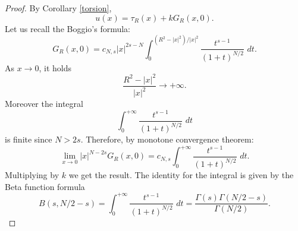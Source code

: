 \documentclass[11pt,a4paper]{article}
\newcommand{\dd}{\,d}
\begin{document}
\begin{proof}
By Corollary \ref{torsion},
\[
u(x)=\tau_{R}(x)+k G_{R}(x,0).
\]
Let us recall the Boggio's formula:
\[
G_{R}(x,0)
=
c_{N,s}|x|^{2s-N}
\int_0^{(R^2-|x|^2)/|x|^2}
\frac{t^{s-1}}{(1+t)^{N/2}}\,\dd t.
\]
As \(x\to0\), it holds
\[
\frac{R^2-|x|^2}{|x|^2}\to+\infty.
\]
Moreover the integral
\[
\int_0^{+\infty}\frac{t^{s-1}}{(1+t)^{N/2}}\,\dd t
\]
is finite since \(N>2s\). Therefore, by monotone convergence theorem:
\[
\lim_{x\to0}|x|^{N-2s}G_{R}(x,0)
=
c_{N,s}
\int_0^{+\infty}\frac{t^{s-1}}{(1+t)^{N/2}}\,\dd t.
\]
Multiplying by \(k\) we get the result. The identity for the integral is given by the Beta function formula
\[
B(s,N/2-s)=
\int_0^{+\infty}\frac{t^{s-1}}{(1+t)^{N/2}}\,\dd t
=
\frac{\Gamma(s)\Gamma(N/2-s)}{\Gamma(N/2)}.
\]
\end{proof}
\end{document}
